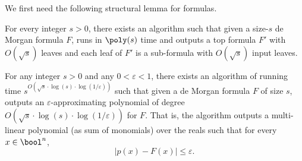     We first need the following structural lemma for formulas.
    
    \begin{lemma}\label{lemma:sat-decomposing}
        For every integer $s>0$, there exists an algorithm such that given a size-$s$ de Morgan formula $F$, runs in $\poly(s)$ time and outputs a top formula $F'$ with $O(\sqrt{s})$ leaves and each leaf of $F'$ is a sub-formula with $O(\sqrt{s})$ input leaves.
    \end{lemma}
    
    \begin{lemma}\label{thm:sat-explicit-polynomial}
		For any integer $s>0$ and any $0<\varepsilon<1$, there exists an algorithm of running time $s^{O\left(\sqrt{s}\cdot\log(s)\cdot\log(1/\varepsilon)\right)}$ such that given a de Morgan formula $F$ of size $s$, outputs an $\varepsilon$-approximating polynomial of degree $O(\sqrt{s}\cdot\log(s)\cdot\log(1/\varepsilon))$ for $F$. That is, the algorithm outputs a multi-linear polynomial (as sum of monomials) over the reals such that for every $x\in\bool^n$,
		\[
			\left| p(x)-F(x)\right| \leq \varepsilon.
		\]
	\end{lemma}
	

